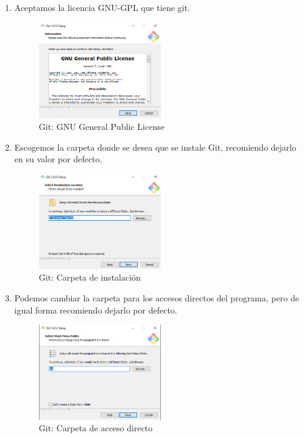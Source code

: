 \begin{enumerate}
	\item Aceptamos la licencia GNU-GPL que tiene git.
	\begin{figure}[!h]
		\centering
		\includegraphics[width=0.5\textwidth]{01Instalacion/Imagenes/windows/instalacion03.png}
		\caption{Git: GNU General Public License}
		\label{fig:gitGPL}
	\end{figure}
	
	\item Escogemos la carpeta donde se desea que se instale Git, recomiendo dejarlo en su valor por defecto.
	\begin{figure}[!h]
		\centering
		\includegraphics[width=0.5\textwidth]{01Instalacion/Imagenes/windows/instalacion04.png}
		\caption{Git: Carpeta de instalación}
		\label{fig:gitCaperta}
	\end{figure}
	\newpage
	\item Podemos cambiar la carpeta para los accesos directos del programa, pero de igual forma recomiendo dejarlo por defecto.
	\begin{figure}[!h]
		\centering
		\includegraphics[width=0.5\textwidth]{01Instalacion/Imagenes//windows/instalacion06.png}
		\caption{Git: Carpeta de acceso directo}
		\label{fig:gitAccesoDirecto}
	\end{figure}
	

\end{enumerate}
